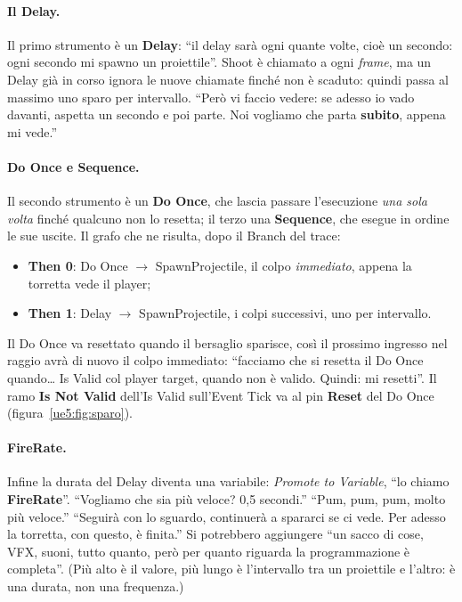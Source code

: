 \paragraph{Il Delay.} Il primo strumento è un \textbf{Delay}: ``il delay sarà ogni quante
volte, cioè un secondo: ogni secondo mi spawno un proiettile''. Shoot è chiamato a ogni
\emph{frame}, ma un Delay già in corso ignora le nuove chiamate finché non è scaduto:
quindi passa al massimo uno sparo per intervallo. ``Però vi faccio vedere: se adesso io
vado davanti, aspetta un secondo e poi parte. Noi vogliamo che parta \textbf{subito},
appena mi vede.''

\paragraph{Do Once e Sequence.} Il secondo strumento è un \textbf{Do Once}, che lascia
passare l'esecuzione \emph{una sola volta} finché qualcuno non lo resetta; il terzo una
\textbf{Sequence}, che esegue in ordine le sue uscite. Il grafo che ne risulta, dopo il
Branch del trace:
\begin{itemize}
  \item \textbf{Then 0}: Do Once $\rightarrow$ SpawnProjectile, il colpo
        \emph{immediato}, appena la torretta vede il player;
  \item \textbf{Then 1}: Delay $\rightarrow$ SpawnProjectile, i colpi successivi,
        uno per intervallo.
\end{itemize}
Il Do Once va resettato quando il bersaglio sparisce, così il prossimo ingresso nel
raggio avrà di nuovo il colpo immediato: ``facciamo che si resetta il Do Once quando\ldots{}
Is Valid col player target, quando non è valido. Quindi: mi resetti''. Il ramo \textbf{Is
Not Valid} dell'Is Valid sull'Event Tick va al pin \textbf{Reset} del Do Once
(figura~\ref{ue5:fig:sparo}).

\paragraph{FireRate.} Infine la durata del Delay diventa una variabile: \emph{Promote to
Variable}, ``lo chiamo \textbf{FireRate}''. ``Vogliamo che sia più veloce? 0,5 secondi.''
``Pum, pum, pum, molto più veloce.'' ``Seguirà con lo sguardo, continuerà a spararci se
ci vede. Per adesso la torretta, con questo, è finita.'' Si potrebbero aggiungere ``un
sacco di cose, VFX, suoni, tutto quanto, però per quanto riguarda la programmazione è
completa''. (Più alto è il valore, più lungo è l'intervallo tra un proiettile e
l'altro: è una durata, non una frequenza.)


